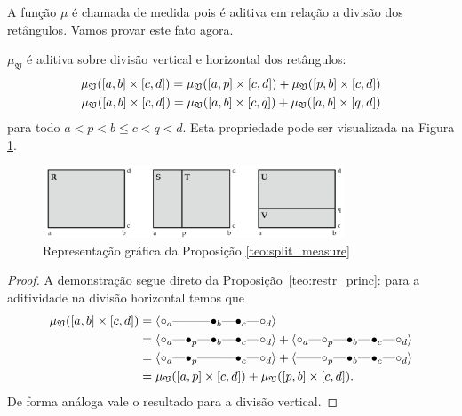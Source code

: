 A função $\mu$ é chamada de medida pois é aditiva em relação a divisão dos retângulos. 
Vamos provar este fato agora.

\begin{propo}\label{teo:split_measure}
    $\mu_{\mathfrak{V}}$ é aditiva sobre divisão vertical e horizontal dos retângulos:
    \begin{align*}
        \mu_{\mathfrak{V}}([a,b]\times[c,d]) = \mu_{\mathfrak{V}}([a,p]\times[c,d]) 
        + \mu_{\mathfrak{V}}([p,b] \times [c,d]) \\
        \mu_{\mathfrak{V}}([a,b]\times[c,d]) = \mu_{\mathfrak{V}}([a,b]\times[c,q]) 
        + \mu_{\mathfrak{V}}([a,b] \times [q,d])
    \end{align*}
    para todo $a < p < b \leq c < q < d$. Esta propriedade pode ser visualizada na Figura 
    \ref{fig:split_measure}.
    \begin{figure}[htpb!]
        \centering
        \includegraphics[width=0.8\textwidth]{images/split_measure.png}
        \caption{Representação gráfica da Proposição \ref{teo:split_measure}}
        \label{fig:split_measure}
    \end{figure}
\end{propo}
\begin{proof}
    A demonstração segue direto da Proposição~\ref{teo:restr_princ}: para a aditividade na divisão
    horizontal temos que
    \begin{align*}
        \mu_{\frakv}([a,b] \times [c,d]) & = \innerproduct{\qoff{a} \qem \qno \qem \qon{b} \qem \qon{c} \qem \qoff{d}} \\
        &=\innerproduct{\qoff{a} \qem \qon{p} \qem \qon{b} \qem \qon{c} \qem \qoff{d}}
          + \innerproduct{\qoff{a} \qem \qoff{p} \qem \qon{b} \qem \qon{c} \qem \qoff{d}} \\
        &=\innerproduct{\qoff{a} \qem \qon{p} \qem \qno \qem \qon{c} \qem \qoff{d}}
          + \innerproduct{\qno \qem \qoff{p} \qem \qon{b} \qem \qon{c} \qem \qoff{d}} \\
        &=\mu_{\frakv}([a,p] \times [c,d]) + \mu_{\frakv}([p,b] \times [c,d]).
    \end{align*}
    De forma análoga vale o resultado para a divisão vertical.  
\end{proof}

